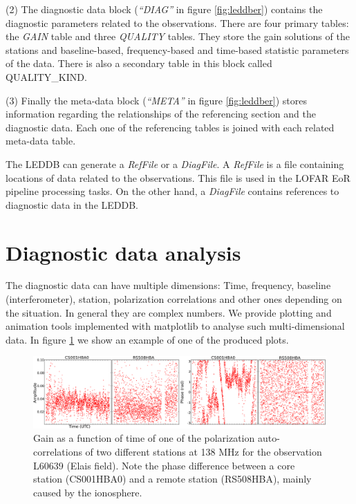(2) The diagnostic data block (\textit{``DIAG''} in figure \ref{fig:leddber}) contains the diagnostic parameters related to the observations. There are four primary tables: the \textit{GAIN} table and three \textit{QUALITY} tables. They store the gain solutions of the stations and baseline-based, frequency-based and time-based statistic parameters of the data. There is also a secondary table in this block called QUA\-LI\-TY\-\_KIND.

(3) Finally the meta-data block (\textit{``META''} in figure \ref{fig:leddber}) stores information regarding the relationships of the referencing section and the diagnostic data. Each one of the referencing tables is joined with each related meta-data table.

The LEDDB can generate a \textit{RefFile} or a \textit{DiagFile}. A \textit{RefFile} is a file containing locations of data related to the observations. This file is used in the LOFAR EoR pipeline processing tasks. On the other hand, a \textit{DiagFile} contains references to diagnostic data in the LEDDB.

\section{Diagnostic data analysis}
The diagnostic data can have multiple dimensions: Time, frequency, baseline (interferometer), station, polarization correlations and other ones depending on the situation. In general they are complex numbers. We provide plotting and animation tools implemented with matplotlib to analyse such multi-dimensional data. In figure \ref{fig:gain} we show an example of one of the produced plots.
\begin{figure}[!ht]
  \centering
    \includegraphics[scale=0.19]{part10/Martinez-rubi_O23/O23_f2.eps} 
  \caption{Gain as a function of time of one of the polarization auto-correlations of two different stations at 138 MHz for the observation L60639 (Elais field). Note the phase difference between a core station (CS001HBA0) and a remote station (RS508HBA), mainly caused by the ionosphere.}
  \label{fig:gain}
\end{figure}

